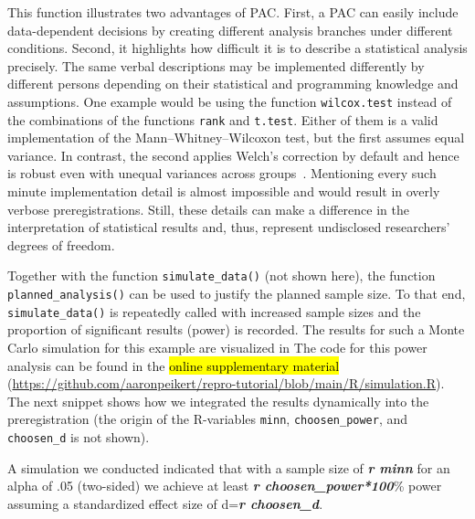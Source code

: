 \documentclass[psych,tutorial,accept,moreauthors,pdftex]{Definitions/mdpi}
\newenvironment{Shaded}{\begin{snugshade}}{\end{snugshade}}
\newcommand{\InformationTok}[1]{\textcolor[rgb]{0.56,0.35,0.01}{\textbf{\textit{#1}}}}
\newcommand{\NormalTok}[1]{#1}
\begin{document}
\begin{paracol}{2}
\switchcolumn


This function illustrates two advantages of PAC. First, a PAC can easily
include data-dependent decisions by creating different analysis branches
under different conditions. Second, it highlights how difficult it is to
describe a statistical analysis precisely. The same verbal descriptions
may be implemented differently by different persons depending on their
statistical and programming knowledge and assumptions. One example would
be using the function \texttt{wilcox.test} instead of the combinations
of the functions \texttt{rank} and \texttt{t.test}. Either of them is a
valid implementation of the Mann--Whitney--Wilcoxon test, but the first
assumes equal variance. In contrast, the second applies Welch's
correction by default and hence is robust even with unequal variances
across groups~\citep{zimmermanRankTransformationsPower1993}. Mentioning
every such minute implementation detail is almost impossible and would
result in overly verbose preregistrations. Still, these details can make
a difference in the interpretation of statistical results and, thus,
represent undisclosed researchers' degrees of freedom.

Together with the function \texttt{simulate\_data()} (not shown here),
the function \texttt{planned\_\linebreak analysis()} can be used to justify the
planned sample size. To that end, \texttt{simulate\_data()} is
repeatedly called with increased sample sizes and the proportion of
significant results (power) is recorded. The results for such a Monte
Carlo simulation for this example are visualized in 
 The code
for this power analysis can be found in the \hl{online supplementary material}
(\url{https://github.com/aaronpeikert/repro-tutorial/blob/main/R/simulation.R}). The next snippet shows how we integrated the
results dynamically into the preregistration (the origin of the
R-variables \texttt{minn}, \texttt{choosen\_power}, and
\texttt{choosen\_d} is not shown).




\vspace{+6pt}
\end{paracol}
\nointerlineskip
\begin{adjustwidth}{0.5cm}{0cm} 
\begin{Shaded}
\begin{Highlighting}[]
\NormalTok{A simulation we conducted indicated that with a sample size of }\InformationTok{\textasciigrave{}r minn\textasciigrave{}}\NormalTok{ for}
\NormalTok{an alpha of .05 (two{-}sided) we achieve at least }\InformationTok{\textasciigrave{}r choosen\_power*100\textasciigrave{}}\NormalTok{\% power}
\NormalTok{assuming a standardized effect size of d=}\InformationTok{\textasciigrave{}r choosen\_d\textasciigrave{}}\NormalTok{.}
\end{Highlighting}
\end{Shaded}
\end{adjustwidth}
\end{document}
